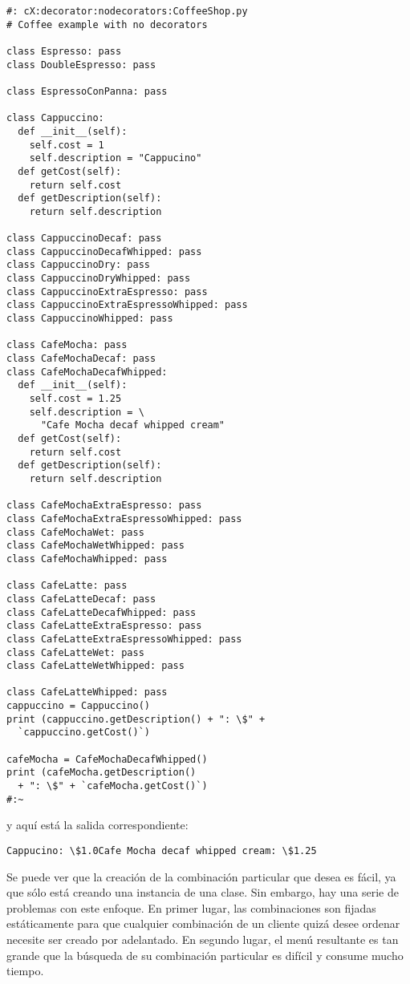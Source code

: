 \begin{lstlisting}
#: cX:decorator:nodecorators:CoffeeShop.py 
# Coffee example with no decorators 

class Espresso: pass 
class DoubleEspresso: pass

class EspressoConPanna: pass 

class Cappuccino: 
  def __init__(self): 
    self.cost = 1 
    self.description = "Cappucino" 
  def getCost(self): 
    return self.cost 
  def getDescription(self): 
    return self.description 
    
class CappuccinoDecaf: pass 
class CappuccinoDecafWhipped: pass 
class CappuccinoDry: pass 
class CappuccinoDryWhipped: pass 
class CappuccinoExtraEspresso: pass 
class CappuccinoExtraEspressoWhipped: pass 
class CappuccinoWhipped: pass 

class CafeMocha: pass 
class CafeMochaDecaf: pass 
class CafeMochaDecafWhipped: 
  def __init__(self): 
    self.cost = 1.25 
    self.description = \ 
      "Cafe Mocha decaf whipped cream" 
  def getCost(self): 
    return self.cost 
  def getDescription(self): 
    return self.description 
    
class CafeMochaExtraEspresso: pass 
class CafeMochaExtraEspressoWhipped: pass 
class CafeMochaWet: pass 
class CafeMochaWetWhipped: pass 
class CafeMochaWhipped: pass 

class CafeLatte: pass 
class CafeLatteDecaf: pass 
class CafeLatteDecafWhipped: pass 
class CafeLatteExtraEspresso: pass 
class CafeLatteExtraEspressoWhipped: pass 
class CafeLatteWet: pass 
class CafeLatteWetWhipped: pass 

class CafeLatteWhipped: pass 
cappuccino = Cappuccino() 
print (cappuccino.getDescription() + ": \$" +  
  `cappuccino.getCost()`) 
  
cafeMocha = CafeMochaDecafWhipped() 
print (cafeMocha.getDescription() 
  + ": \$" + `cafeMocha.getCost()`) 
#:~ 
\end{lstlisting}

y aquí está la salida correspondiente: \newline

\begin{lstlisting} 
Cappucino: \$1.0Cafe Mocha decaf whipped cream: \$1.25
\end{lstlisting}

Se puede ver que la creación de la combinación particular que desea es fácil, ya que sólo está creando una instancia de una clase. Sin embargo, hay una serie de problemas con este enfoque. En primer lugar, las combinaciones son fijadas estáticamente para que cualquier combinación de un cliente quizá desee ordenar necesite ser creado por adelantado. En segundo lugar, el menú resultante es tan grande que la búsqueda de su combinación particular es difícil y consume mucho tiempo.     \newline



